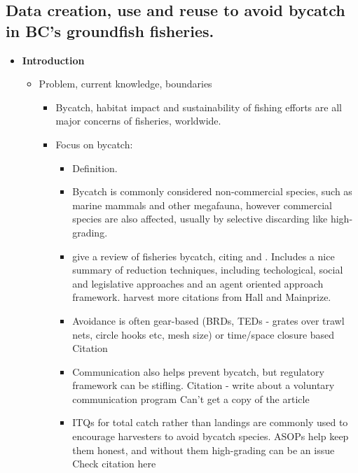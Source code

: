 \documentclass{article}
\newcommand{\sj}[1]{{\color{red}\mbox{}\marginpar{\raggedleft\hspace{0pt}*} #1}}
\begin{document}


\subsection*{Data creation, use and reuse to avoid bycatch in BC's groundfish fisheries.}

\begin{itemize}
  \item {\bf Introduction}
    \begin{itemize}
      \item Problem, current knowledge, boundaries
        \begin{itemize}
          \item Bycatch, habitat impact and sustainability of fishing efforts are all major concerns of fisheries, worldwide.
          \item Focus on bycatch:
            \begin{itemize}
              \item Definition.
              \item Bycatch is commonly considered non-commercial species, such as marine mammals and other megafauna, however commercial species are also affected, usually by selective discarding like high-grading.
              \item \citet{hall2005managing} give a review of fisheries bycatch, citing \citet{AlversonEtal1994} and \citet{kelleher2005discards}. Includes a nice summary of reduction techniques, including techological, social and legislative approaches and an agent oriented approach framework. \sj{harvest more citations from Hall and Mainprize.}
              \item Avoidance is often gear-based (BRDs, TEDs - grates over trawl nets, circle hooks etc, mesh size) or time/space closure based \sj{Citation}
              \item Communication also helps prevent bycatch, but regulatory framework can be stifling. \sj{Citation} - \citet{gauvin1995implementation} write about a voluntary communication program \sj{Can't get a copy of the article}
              \item ITQs for total catch rather than landings are commonly used to encourage harvesters to avoid bycatch species. ASOPs help keep them honest, and without them high-grading can be an issue \citep{branch2004influence} \sj{Check citation here}

\end{itemize}
\end{itemize}
\end{itemize}
\end{itemize}
\end{document}

